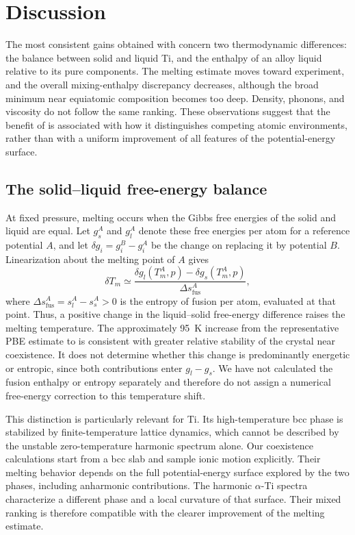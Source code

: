 \section{Discussion}
\label{sec:discussion}

The most consistent gains obtained with \rscan{} concern two thermodynamic differences: the balance between solid and liquid Ti, and the enthalpy of an alloy liquid relative to its pure components.
The melting estimate moves toward experiment, and the overall mixing-enthalpy discrepancy decreases, although the broad minimum near equiatomic composition becomes too deep.
Density, phonons, and viscosity do not follow the same ranking.
These observations suggest that the benefit of \rscan{} is associated with how it distinguishes competing atomic environments, rather than with a uniform improvement of all features of the potential-energy surface.

\subsection{The solid--liquid free-energy balance}

At fixed pressure, melting occurs when the Gibbs free energies of the solid and liquid are equal.
Let $g_s^A$ and $g_l^A$ denote these free energies per atom for a reference potential $A$, and let $\delta g_i=g_i^B-g_i^A$ be the change on replacing it by potential $B$.
Linearization about the melting point of $A$ gives
\begin{equation}
 \delta T_m \simeq
 \frac{\delta g_l(T_m^A,p)-\delta g_s(T_m^A,p)}
 {\Delta s_{\mathrm{fus}}^A},
 \label{eq:melting_shift}
\end{equation}
where $\Delta s_{\mathrm{fus}}^A=s_l^A-s_s^A>0$ is the entropy of fusion per atom, evaluated at that point.
Thus, a positive change in the liquid--solid free-energy difference raises the melting temperature.
The approximately 95~K increase from the representative PBE estimate to \rscan{} is consistent with greater relative stability of the crystal near coexistence.
It does not determine whether this change is predominantly energetic or entropic, since both contributions enter $g_l-g_s$.
We have not calculated the fusion enthalpy or entropy separately and therefore do not assign a numerical free-energy correction to this temperature shift.

This distinction is particularly relevant for Ti.
Its high-temperature bcc phase is stabilized by finite-temperature lattice dynamics, which cannot be described by the unstable zero-temperature harmonic spectrum alone.\cite{Souvatzis2008}
Our coexistence calculations start from a bcc slab and sample ionic motion explicitly.
Their melting behavior depends on the full potential-energy surface explored by the two phases, including anharmonic contributions.
The harmonic $\alpha$-Ti spectra characterize a different phase and a local curvature of that surface.
Their mixed ranking is therefore compatible with the clearer improvement of the \rscan{} melting estimate.

